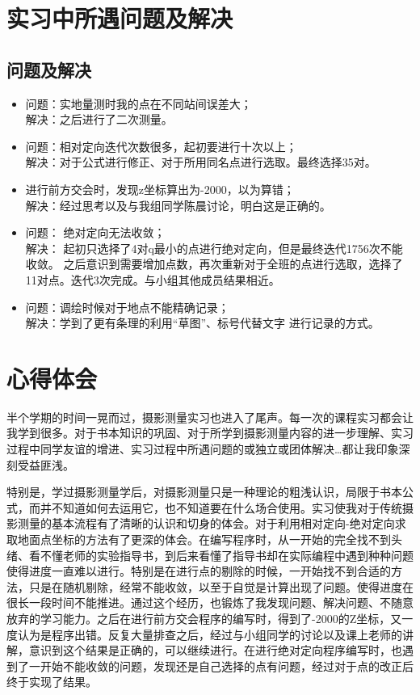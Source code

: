 \section{实习中所遇问题及解决}
\subsection{问题及解决}
  \begin{itemize}
\item 问题：实地量测时我的点在不同站间误差大；\\
      解决：之后进行了二次测量。
\item 问题：相对定向迭代次数很多，起初要进行十次以上；   \\
       解决：对于公式进行修正、对于所用同名点进行选取。最终选择35对。
\item 进行前方交会时，发现z坐标算出为-2000，以为算错；  \\
       解决：经过思考以及与我组同学陈晨讨论，明白这是正确的。
\item 问题： 绝对定向无法收敛；\\
      解决： 起初只选择了4对q最小的点进行绝对定向，但是最终迭代1756次不能收敛。 之后意识到需要增加点数，再次重新对于全班的点进行选取，选择了11对点。迭代3次完成。与小组其他成员结果相近。
\item 问题：调绘时候对于地点不能精确记录； \\
      解决：学到了更有条理的利用“草图”、标号代替文字 进行记录的方式。
\end{itemize}

\section{心得体会}

半个学期的时间一晃而过，摄影测量实习也进入了尾声。每一次的课程实习都会让我学到很多。对于书本知识的巩固、对于所学到摄影测量内容的进一步理解、实习过程中同学友谊的增进、实习过程中所遇问题的或独立或团体解决…都让我印象深刻受益匪浅。

特别是，学过摄影测量学后，对摄影测量只是一种理论的粗浅认识，局限于书本公式，而并不知道如何去运用它，也不知道要在什么场合使用。实习使我对于传统摄影测量的基本流程有了清晰的认识和切身的体会。对于利用相对定向-绝对定向求取地面点坐标的方法有了更深的体会。在编写程序时，从一开始的完全找不到头绪、看不懂老师的实验指导书，到后来看懂了指导书却在实际编程中遇到种种问题使得进度一直难以进行。特别是在进行点的剔除的时候，一开始找不到合适的方法，只是在随机剔除，经常不能收敛，以至于自觉是计算出现了问题。使得进度在很长一段时间不能推进。通过这个经历，也锻炼了我发现问题、解决问题、不随意放弃的学习能力。之后在进行前方交会程序的编写时，得到了-2000的Z坐标，又一度认为是程序出错。反复大量排查之后，经过与小组同学的讨论以及课上老师的讲解，意识到这个结果是正确的，可以继续进行。在进行绝对定向程序编写时，也遇到了一开始不能收敛的问题，发现还是自己选择的点有问题，经过对于点的改正后终于实现了结果。

